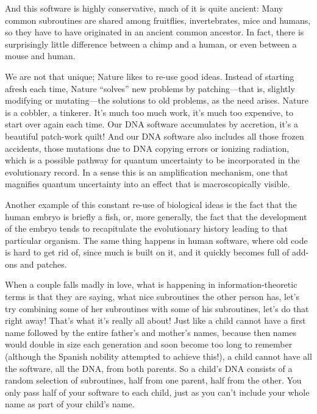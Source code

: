\documentclass[12pt]{book}
\begin{document}
And this software is highly conservative, much of it is quite ancient:
Many common subroutines are shared among 
fruitflies, invertebrates, mice and humans,
so they have to have originated in an ancient common ancestor.
In fact, there is surprisingly little difference between a chimp and a human, or even
between a mouse and human. 
 
We are not that
unique; Nature likes to re-use good ideas. Instead of starting afresh each time,
Nature ``solves'' new problems by
patching---that is, slightly modifying or mutating---the solutions to old problems, as the
need arises. Nature is a cobbler, a tinkerer.  It's much too much work,
it's much too expensive, to start over again each time.
Our DNA software accumulates by accretion, it's a beautiful patch-work quilt!
And our DNA software 
also includes all those frozen accidents, those mutations due to DNA copying errors
or ionizing radiation, which is a possible pathway for quantum uncertainty to be incorporated
in the evolutionary record.
In a sense this is an amplification mechanism, one that magnifies quantum uncertainty into an
effect that is macroscopically visible.
 
Another example of this constant re-use of biological ideas
is the fact that the human embryo is briefly a fish, or, more generally, the fact that the
development of the embryo tends to recapitulate 
the evolutionary history leading to that particular organism.
The same thing happens in human software, where old code is hard to get rid of, since much
is built on it, and it quickly becomes full of add-ons and patches.
 
When a couple falls madly in love, what is happening in information-theoretic terms is that they
are saying, what nice subroutines the other person has, let's try combining some of her
subroutines with some of his subroutines, let's do that right away!  
That's what it's really all about!
Just like a child cannot have a first name
followed by the entire father's and mother's names, because then names would 
double in size each generation and soon
become too long to remember (although the Spanish
nobility attempted to achieve this!), a child cannot have
all the software, all the DNA, from both parents.  So a child's DNA consists of a random
selection of subroutines, half from one parent, half from the other.
You only pass half of your software to each child, just as you can't include your whole name
as part of your child's name.
 
\end{document}
